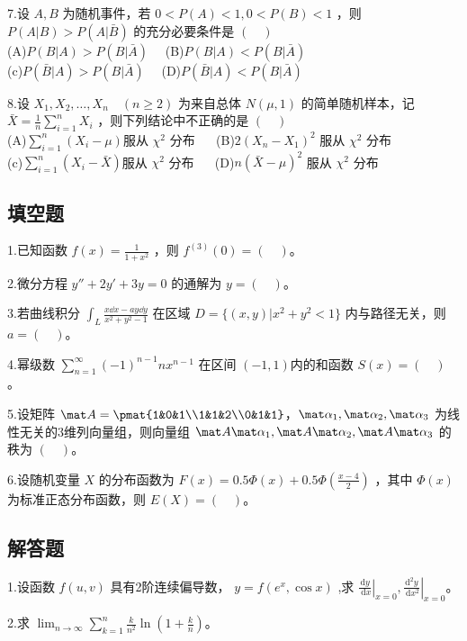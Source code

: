 7.设 $A,B$ 为随机事件，若 $0<P(A)<1,0<P(B)<1$ ，则 $P(A|B)>P(A|\bar{B})$  的充分必要条件是 $(\quad)$\\
(A)$P(B|A)>P(B|\bar{A}) \quad$
(B)$P(B|A)<P(B|\bar{A}) \quad$\\
(c)$P(\bar{B}|A)>P(B|\bar{A}) \quad$
(D)$P(\bar{B}|A)<P(B|\bar{A}) \quad$

8.设 $X_1,X_2,\dots,X_n \quad (n \ge 2)$ 为来自总体 $N(\mu,1)$ 的简单随机样本，记 $\displaystyle \bar{X}=\frac{1}{n} \sum_{i=1}^n X_i$ ，则下列结论中不正确的是 $(\quad)$\\ 
(A)$\displaystyle \sum_{i=1}^n (X_i-\mu)$服从 $\chi^2$ 分布 $\quad$
(B)$2(X_n-X_1)^2$ 服从 $\chi^2$ 分布\\
(c)$\displaystyle \sum_{i=1}^n (X_i-\bar{X})$服从 $\chi^2$ 分布 $\quad$
(D)$n(\bar{X}-\mu)^2$ 服从  $\chi^2$ 分布

\subsection{填空题}
1.已知函数 $ \displaystyle f(x)=\frac{1}{1+x^2}$  ，则   $f^{(3)}(0)=(\quad)$。

2.微分方程 $y''+2y'+3y=0$  的通解为 $y=(\quad)$。

3.若曲线积分 $\displaystyle \int_L \frac{x\dd{x-ay\dd{y}}}{x^2+y^2-1}$ 在区域 $D=\{(x,y)|x^2+y^2<1\}$ 内与路径无关，则 $a=(\quad)$。

4.幂级数 $\displaystyle \sum_{n=1}^\infty (-1)^{n-1} nx^{n-1}$  在区间 $(-1,1) $内的和函数 $S(x)=(\quad)$ 。

5.设矩阵 $\mat A=\pmat{1&0&1\\1&1&2\\0&1&1}$，$\mat \alpha_1,\mat \alpha_2,\mat \alpha_3$  为线性无关的3维列向量组，则向量组 $\mat A\mat \alpha_1,\mat A \mat \alpha_2,\mat A \mat \alpha_3$ 的秩为 $(\quad)$。

6.设随机变量 $X$  的分布函数为 $\displaystyle F(x)=0.5\Phi(x)+0.5\Phi(\frac{x-4}{2})$  ，其中 $\Phi(x)$ 为标准正态分布函数，则 $E(X)=(\quad)$。


\subsection{解答题}
1.设函数 $f(u,v)$  具有2阶连续偏导数， $y=f(e^x,\cos x)$  ,求 
$\displaystyle \left.\frac{\mathrm{d} y}{\mathrm{~d} x}\right|_{x=0},\left.\frac{\mathrm{d}^2 y}{\mathrm{~d} x^2}\right|_{x=0}$。

2.求 $\displaystyle \lim_{n \to \infty} \sum_{k=1}^n \frac{k}{n^2} \ln(1+\frac{k}{n})$。

